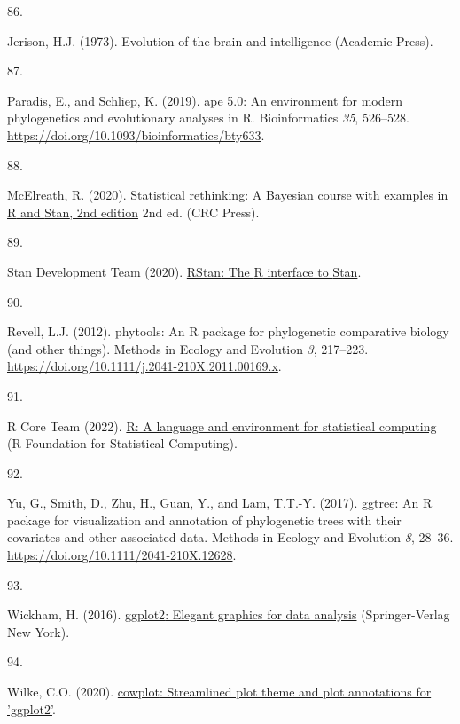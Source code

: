 \documentclass[
  man, donotrepeattitle,floatsintext]{apa6}
\newlength{\cslhangindent}
\newlength{\csllabelwidth}
\newlength{\cslentryspacingunit} %
\newenvironment{CSLReferences}[2] %
 {%
  \setlength{\parindent}{0pt}
  \ifodd #1
  \let\oldpar\par
  \def\par{\hangindent=\cslhangindent\oldpar}
  \fi
  \setlength{\parskip}{#2\cslentryspacingunit}
 }%
 {}
\newcommand{\CSLLeftMargin}[1]{\parbox[t]{\csllabelwidth}{#1}}
\newcommand{\CSLRightInline}[1]{\parbox[t]{\linewidth - \csllabelwidth}{#1}\break}
\begin{document}
\begin{CSLReferences}{0}{0}
\leavevmode{}%
\CSLLeftMargin{86. }%
\CSLRightInline{Jerison, H.J. (1973). Evolution of the brain and intelligence (Academic Press).}

\leavevmode{}%
\CSLLeftMargin{87. }%
\CSLRightInline{Paradis, E., and Schliep, K. (2019). {ape} 5.0: An environment for modern phylogenetics and evolutionary analyses in {R}. Bioinformatics \emph{35}, 526--528. \url{https://doi.org/10.1093/bioinformatics/bty633}.}

\leavevmode{}%
\CSLLeftMargin{88. }%
\CSLRightInline{McElreath, R. (2020). \href{http://xcelab.net/rm/statistical-rethinking/}{Statistical rethinking: A {Bayesian} course with examples in {R} and {Stan}, 2nd edition} 2nd ed. (CRC Press).}

\leavevmode{}%
\CSLLeftMargin{89. }%
\CSLRightInline{Stan Development Team (2020). \href{http://mc-stan.org/}{{RStan}: The {R} interface to {Stan}}.}

\leavevmode{}%
\CSLLeftMargin{90. }%
\CSLRightInline{Revell, L.J. (2012). {phytools}: An {R} package for phylogenetic comparative biology (and other things). Methods in Ecology and Evolution \emph{3}, 217--223. \url{https://doi.org/10.1111/j.2041-210X.2011.00169.x}.}

\leavevmode{}%
\CSLLeftMargin{91. }%
\CSLRightInline{R Core Team (2022). \href{https://www.R-project.org/}{R: A language and environment for statistical computing} (R Foundation for Statistical Computing).}

\leavevmode{}%
\CSLLeftMargin{92. }%
\CSLRightInline{Yu, G., Smith, D., Zhu, H., Guan, Y., and Lam, T.T.-Y. (2017). {ggtree}: An {R} package for visualization and annotation of phylogenetic trees with their covariates and other associated data. Methods in Ecology and Evolution \emph{8}, 28--36. \url{https://doi.org/10.1111/2041-210X.12628}.}

\leavevmode{}%
\CSLLeftMargin{93. }%
\CSLRightInline{Wickham, H. (2016). \href{https://ggplot2.tidyverse.org}{{ggplot2}: Elegant graphics for data analysis} (Springer-Verlag New York).}

\leavevmode{}%
\CSLLeftMargin{94. }%
\CSLRightInline{Wilke, C.O. (2020). \href{https://CRAN.R-project.org/package=cowplot}{{cowplot}: Streamlined plot theme and plot annotations for 'ggplot2'}.}


\end{CSLReferences}
\end{document}
